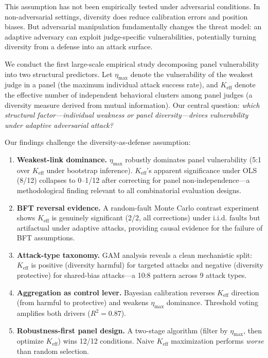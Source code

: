 \documentclass[11pt,a4paper]{article}
\begin{document}
This assumption has not been empirically tested under adversarial conditions. In non-adversarial settings, diversity does reduce calibration errors and position biases. But adversarial manipulation fundamentally changes the threat model: an adaptive adversary can exploit judge-specific vulnerabilities, potentially turning diversity from a defense into an attack surface.

We conduct the first large-scale empirical study decomposing panel vulnerability into two structural predictors. Let $\eta_{\max}$ denote the vulnerability of the weakest judge in a panel (the maximum individual attack success rate), and $K_{\text{eff}}$ denote the effective number of independent behavioral clusters among panel judges (a diversity measure derived from mutual information). Our central question: \emph{which structural factor---individual weakness or panel diversity---drives vulnerability under adaptive adversarial attack?}

Our findings challenge the diversity-as-defense assumption:

\begin{enumerate}[leftmargin=*,itemsep=2pt]
\item \textbf{Weakest-link dominance.} $\eta_{\max}$ robustly dominates panel vulnerability (5:1 over $K_{\text{eff}}$ under bootstrap inference). $K_{\text{eff}}$'s apparent significance under OLS (8/12) collapses to 0--1/12 after correcting for panel non-independence---a methodological finding relevant to all combinatorial evaluation designs.

\item \textbf{BFT reversal evidence.} A random-fault Monte Carlo contrast experiment shows $K_{\text{eff}}$ is genuinely significant (2/2, all corrections) under i.i.d. faults but artifactual under adaptive attacks, providing causal evidence for the failure of BFT assumptions.

\item \textbf{Attack-type taxonomy.} GAM analysis reveals a clean mechanistic split: $K_{\text{eff}}$ is positive (diversity harmful) for targeted attacks and negative (diversity protective) for shared-bias attacks---a 10:8 pattern across 9 attack types.

\item \textbf{Aggregation as control lever.} Bayesian calibration reverses $K_{\text{eff}}$ direction (from harmful to protective) and weakens $\eta_{\max}$ dominance. Threshold voting amplifies both drivers ($R^2=0.87$).

\item \textbf{Robustness-first panel design.} A two-stage algorithm (filter by $\eta_{\max}$, then optimize $K_{\text{eff}}$) wins 12/12 conditions. Naive $K_{\text{eff}}$ maximization performs \emph{worse} than random selection.
\end{enumerate}
\end{document}
